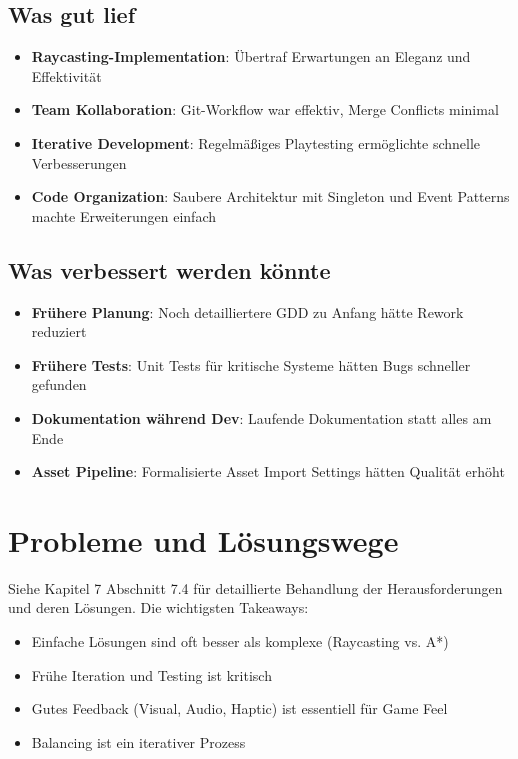\documentclass[
  a4paper,
  11pt,
  ngerman,
  parskip=half,
  bibliography=totoc,
  listof=totoc
]{scrreprt}
\begin{document}
\subsection{Was gut lief}

\begin{itemize}
    \item \textbf{Raycasting-Implementation}: Übertraf Erwartungen an Eleganz und Effektivität
    \item \textbf{Team Kollaboration}: Git-Workflow war effektiv, Merge Conflicts minimal
    \item \textbf{Iterative Development}: Regelmäßiges Playtesting ermöglichte schnelle Verbesserungen
    \item \textbf{Code Organization}: Saubere Architektur mit Singleton und Event Patterns machte Erweiterungen einfach
\end{itemize}

\subsection{Was verbessert werden könnte}

\begin{itemize}
    \item \textbf{Frühere Planung}: Noch detailliertere GDD zu Anfang hätte Rework reduziert
    \item \textbf{Frühere Tests}: Unit Tests für kritische Systeme hätten Bugs schneller gefunden
    \item \textbf{Dokumentation während Dev}: Laufende Dokumentation statt alles am Ende
    \item \textbf{Asset Pipeline}: Formalisierte Asset Import Settings hätten Qualität erhöht
\end{itemize}

\section{Probleme und Lösungswege}

Siehe Kapitel 7 Abschnitt 7.4 für detaillierte Behandlung der Herausforderungen und deren Lösungen. Die wichtigsten Takeaways:

\begin{itemize}
    \item Einfache Lösungen sind oft besser als komplexe (Raycasting vs. A*)
    \item Frühe Iteration und Testing ist kritisch
    \item Gutes Feedback (Visual, Audio, Haptic) ist essentiell für Game Feel
    \item Balancing ist ein iterativer Prozess
\end{itemize}
\end{document}
